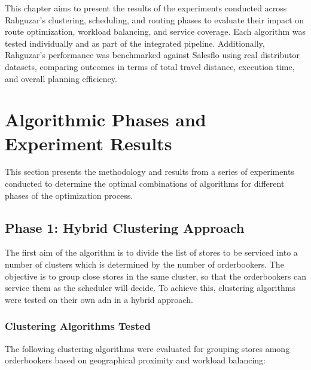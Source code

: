 This chapter aims to present the results of the experiments conducted across Rahguzar’s clustering, scheduling, and routing phases to evaluate their impact on route optimization, workload balancing, and service coverage. Each algorithm was tested individually and as part of the integrated pipeline. Additionally, Rahguzar’s performance was benchmarked against Salesflo using real distributor datasets, comparing outcomes in terms of total travel distance, execution time, and overall planning efficiency.

\section{Algorithmic Phases and Experiment Results}

This section presents the methodology and results from a series of experiments conducted to determine the optimal combinations of algorithms for different phases of the optimization process.




\subsection{Phase 1: Hybrid Clustering Approach}
The first aim of the algorithm is to divide the list of stores to be serviced into a number of clusters which is determined by the number of orderbookers.
The objective is to group close stores in the same cluster, so that the orderbookers can service them as the scheduler will decide.
To achieve this, clustering algorithms were tested on their own adn in a hybrid approach.

\subsubsection{Clustering Algorithms Tested}

The following clustering algorithms were evaluated for grouping stores among orderbookers based on geographical proximity and workload balancing:


